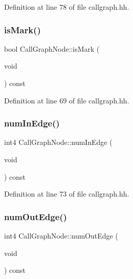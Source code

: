 Definition at line 78 of file callgraph.\+hh.

\mbox{\label{class_call_graph_node_aaa58a7c325e39670fcb45b98fb9882b4}} 
\subsubsection{\texorpdfstring{isMark()}{isMark()}}
{\footnotesize\ttfamily bool Call\+Graph\+Node\+::is\+Mark (\begin{DoxyParamCaption}\item[{void}]{ }\end{DoxyParamCaption}) const\hspace{0.3cm}{\ttfamily [inline]}}



Definition at line 69 of file callgraph.\+hh.

\mbox{\label{class_call_graph_node_aa6130dd67993dbf34737b9560ff88dbd}} 
\subsubsection{\texorpdfstring{numInEdge()}{numInEdge()}}
{\footnotesize\ttfamily int4 Call\+Graph\+Node\+::num\+In\+Edge (\begin{DoxyParamCaption}\item[{void}]{ }\end{DoxyParamCaption}) const\hspace{0.3cm}{\ttfamily [inline]}}



Definition at line 73 of file callgraph.\+hh.

\mbox{\label{class_call_graph_node_a0c8f85c80e891f9d7fe71277d0391671}} 
\subsubsection{\texorpdfstring{numOutEdge()}{numOutEdge()}}
{\footnotesize\ttfamily int4 Call\+Graph\+Node\+::num\+Out\+Edge (\begin{DoxyParamCaption}\item[{void}]{ }\end{DoxyParamCaption}) const\hspace{0.3cm}{\ttfamily [inline]}}



